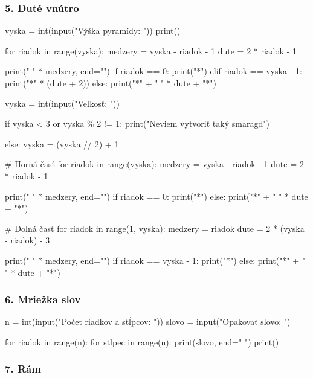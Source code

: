 \subsubsection*{5. Duté vnútro}

\begin{solution}
vyska = int(input("Výška pyramídy: "))
print()

for riadok in range(vyska):
    medzery = vyska - riadok - 1
    dute = 2 * riadok - 1

    print(" " * medzery, end="")
    if riadok == 0:
        print("*")
    elif riadok == vyska - 1:
        print("*" * (dute + 2))
    else:
        print("*" + " " * dute + "*")
\end{solution}

\begin{solution}
vyska = int(input("Veľkosť: "))

if vyska < 3 or vyska \% 2 != 1:
    print("Neviem vytvoriť taký smaragd")

else:
    vyska = (vyska // 2) + 1

    # Horná časť
    for riadok in range(vyska):
        medzery = vyska - riadok - 1
        dute = 2 * riadok - 1

        print(" " * medzery, end="")
        if riadok == 0:
            print("*")
        else:
            print("*" + " " * dute + "*")

    # Dolná časť
    for riadok in range(1, vyska):
        medzery = riadok
        dute = 2 * (vyska - riadok) - 3

        print(" " * medzery, end="")
        if riadok == vyska - 1:
            print("*")
        else:
            print("*" + " " * dute + "*")
\end{solution}


\subsubsection*{6. Mriežka slov}

\begin{solution}
n = int(input("Počet riadkov a stĺpcov: "))
slovo = input("Opakovať slovo: ")

for riadok in range(n):
    for stlpec in range(n):
        print(slovo, end=" ")
    print()
\end{solution}


\subsubsection*{7. Rám}

